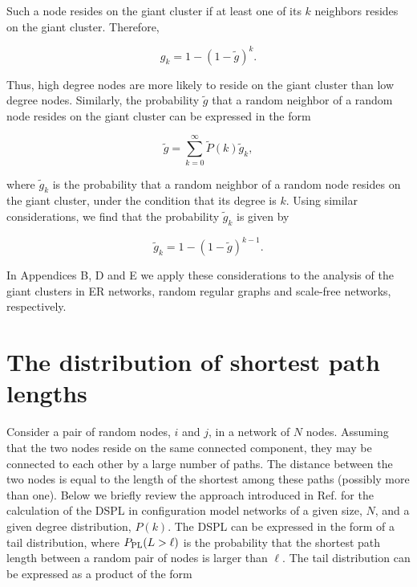 \documentclass[preprint,pre,superscriptaddress,showpacs]{revtex4}
\begin{document}
\noindent
Such a node resides on the giant cluster if at least one of its $k$ neighbors
resides on the giant cluster. 
Therefore,

\begin{equation}
g_k = 1 - (1 - {\tilde g})^k.
\label{eq:g_kp}
\end{equation}

\noindent
Thus, high degree nodes are more likely to reside on the giant cluster than
low degree nodes.
Similarly, the probability $\tilde g$ that a random neighbor of a random node resides
on the giant cluster can be expressed in the form

\begin{equation}
{\tilde g} = \sum_{k=0}^{\infty} \widetilde P(k) {\tilde g}_k,
\end{equation}

\noindent
where $\tilde g_k$ is the probability that
a random neighbor of a random node resides on the giant cluster,
under the condition that its degree is $k$.
Using similar considerations, 
we find that the probability $\tilde g_k$ is given by

\begin{equation}
\tilde g_k = 1 - (1 - \tilde g)^{k-1}.
\label{eq:tg_k}
\end{equation}

\noindent
In Appendices B, D and E we apply these considerations to the analysis of
the giant clusters in ER networks, random regular graphs and scale-free
networks, respectively. 

\section{The distribution of shortest path lengths}

Consider a pair of random nodes, $i$ and $j$, in a 
network of $N$ nodes. Assuming that the two nodes
reside on the same connected component, they may be
connected to each other by a large number of paths. 
The distance between the two nodes is equal to
the length of the shortest among these paths 
(possibly more than one). 
Below we briefly review the approach introduced in Ref.
\cite{Nitzan2016} 
for the calculation of the DSPL
in configuration model networks of a given size, $N$, and a given degree distribution,
$P(k)$.
The DSPL can be expressed in the form of a tail distribution,
where $P_{\rm PL}(L>\ell)$ is the probability
that the shortest path length between a random pair of nodes
is larger than $\ell$.
The tail distribution can be expressed as a product of the form
\end{document}

